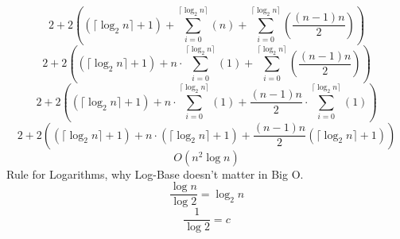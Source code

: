 \documentclass{article}
\begin{document}
$$2+2\left(\left(\lceil\log_2n\rceil+1\right)+\sum_{i=0}^{\lceil\log_2n\rceil}\left(n\right)+\sum_{i=0}^{\lceil\log_2n\rceil}\left(\frac{\left(n-1\right)n}{2}\right)\right)$$
$$2+2\left(\left(\lceil\log_2n\rceil+1\right)+n\cdot\sum_{i=0}^{\lceil\log_2n\rceil}\left(1\right)+\sum_{i=0}^{\lceil\log_2n\rceil}\left(\frac{\left(n-1\right)n}{2}\right)\right)$$
$$2+2\left(\left(\lceil\log_2n\rceil+1\right)+n\cdot\sum_{i=0}^{\lceil\log_2n\rceil}\left(1\right)+\frac{\left(n-1\right)n}{2}\cdot\sum_{i=0}^{\lceil\log_2n\rceil}\left(1\right)\right)$$
$$2+2\left(\left(\lceil\log_2n\rceil+1\right)+n\cdot\left(\lceil\log_2n\rceil+1\right)+\frac{\left(n-1\right)n}{2}\left(\lceil\log_2n\rceil+1\right)\right)$$
$$O(n^2\log n)$$
Rule for Logarithms, why Log-Base doesn't matter in Big O.
$$\frac{\log n}{\log 2}=\log_2 n$$
$$\frac{1}{\log 2}=c$$
\end{document}

